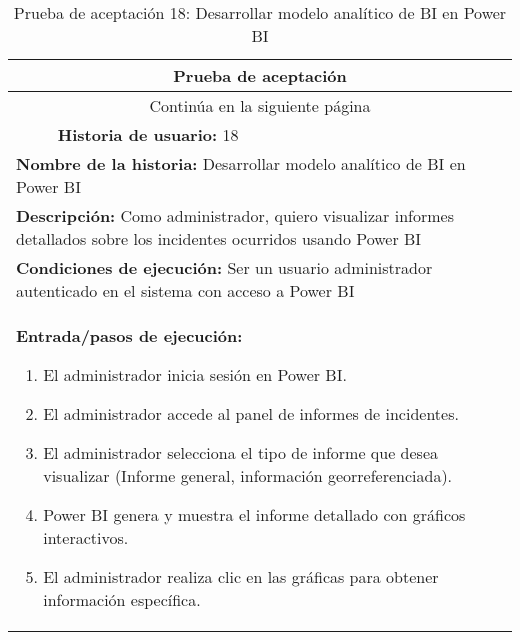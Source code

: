 \begin{longtable}{|p{6.7cm}|p{6.7cm}|}
    \caption{Prueba de aceptación 18: Desarrollar modelo analítico de BI en Power BI} \label{tab:prueba-18}                                                      \\
    \hline
    \multicolumn{2}{|c|}{\textbf{Prueba de aceptación}}                                                                                                          \\
    \hline
    \endfirsthead
    \hline
    \endhead
    \hline
    \multicolumn{2}{|c|}{{Continúa en la siguiente página}}                                                                                                      \\
    \hline
    \endfoot
    \hline
    \endlastfoot
    \multicolumn{1}{|p{6.7cm}|}{\textbf{Número} 18} & \multicolumn{1}{|p{6.7cm}|}{\textbf{Historia de usuario:} 18}                                              \\
    \hline
    \multicolumn{2}{|p{13.4cm}|}{\textbf{Nombre de la historia:} Desarrollar modelo analítico de BI en Power BI}                                                 \\
    \hline
    \multicolumn{2}{|p{13.4cm}|}{\textbf{Descripción:} Como administrador, quiero visualizar informes detallados sobre los incidentes ocurridos usando Power BI} \\
    \hline
    \multicolumn{2}{|p{13.4cm}|}{\textbf{Condiciones de ejecución:} Ser un usuario administrador autenticado en el sistema con acceso a Power BI}                \\
    \hline
    \multicolumn{2}{|p{13.4cm}|}{\textbf{Entrada/pasos de ejecución:}
    \begin{enumerate}
        \item El administrador inicia sesión en Power BI.
        \item El administrador accede al panel de informes de incidentes.
        \item El administrador selecciona el tipo de informe que desea visualizar (Informe general, información georreferenciada).
        \item Power BI genera y muestra el informe detallado con gráficos interactivos.
        \item El administrador realiza clic en las gráficas para obtener información específica.
    \end{enumerate}}                                    \\
    \hline

\end{longtable}
